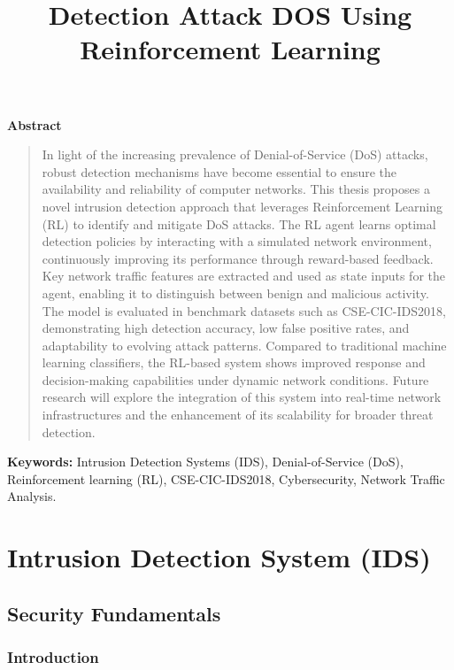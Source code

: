 \documentclass{report}
\title{\Huge{\textbf{Detection Attack DOS Using Reinforcement Learning}}}
\author{}
\date{}
\begin{document}
\maketitle
\begin{center}
    {\LARGE \textbf{Abstract}}  %
\end{center}

\vspace{0.5em}

\begin{quote}
\Large
In light of the increasing prevalence of Denial-of-Service (DoS) attacks, robust detection mechanisms have become essential to ensure the availability and reliability of computer networks. This thesis proposes a novel intrusion detection approach that leverages Reinforcement Learning (RL) to identify and mitigate DoS attacks. The RL agent learns optimal detection policies by interacting with a simulated network environment, continuously improving its performance through reward-based feedback. Key network traffic features are extracted and used as state inputs for the agent, enabling it to distinguish between benign and malicious activity. The model is evaluated in benchmark datasets such as CSE-CIC-IDS2018, demonstrating high detection accuracy, low false positive rates, and adaptability to evolving attack patterns. Compared to traditional machine learning classifiers, the RL-based system shows improved response and decision-making capabilities under dynamic network conditions. Future research will explore the integration of this system into real-time network infrastructures and the enhancement of its scalability for broader threat detection.
\end{quote}


\textbf{Keywords:} Intrusion Detection Systems (IDS), Denial-of-Service (DoS), Reinforcement learning (RL), CSE-CIC-IDS2018, Cybersecurity, Network Traffic Analysis.
\tableofcontents
\newpage

\chapter{Intrusion Detection System (IDS)}


\section{Security Fundamentals}

\subsection*{Introduction}
\end{document}
